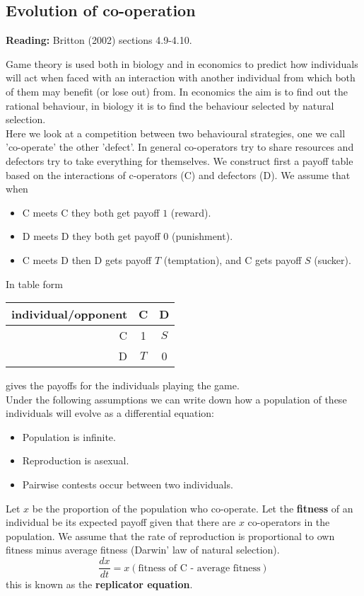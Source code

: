 
\subsection{\Large Evolution of co-operation}

\label{evocoop}

{\bf Reading:} Britton (2002) sections 4.9-4.10.

Game theory is used both in biology and in economics to predict how
individuals will act when faced with an interaction with another
individual from which both of them may benefit (or lose out) from. In
economics the aim is to find out the rational behaviour, in biology it
is to find the behaviour selected by natural selection.\\

Here we look at a competition between two behavioural
strategies, one we call 'co-operate' the other 'defect'. In general
co-operators try to share resources and defectors try to take
everything for themselves. We construct first a payoff table based on
the interactions of c-operators (C) and defectors (D). We assume that
when
\begin{itemize}
\item C meets C they both get payoff $1$ (reward).
\item D meets D they both get payoff $0$ (punishment).
\item C meets D then D gets payoff $T$ (temptation), and C gets payoff
$S$ (sucker).
\end{itemize}
In table form

\begin{tabular}{r|cc}
individual/opponent & C & D \\
\hline
C & 1 & $S$ \\
D & $T$ & 0 
\end{tabular}

gives the payoffs for the individuals playing the game.\\

Under the following assumptions we can write down how a population of
these individuals will evolve as a differential equation:
\begin{itemize}
\item Population is infinite.
\item Reproduction is asexual.
\item Pairwise contests occur between two individuals.
\end{itemize}
Let $x$ be the proportion of the population who co-operate. Let the
{\bf fitness} of an individual be its expected payoff given that there
are $x$ co-operators in the population. We assume that the rate of
reproduction is proportional to own fitness minus average fitness
(Darwin' law of natural selection).
\begin{equation}
\frac{dx}{dt} = x (\mbox{fitness of C - average fitness}) \label{repeq}
\end{equation}
this is known as the {\bf replicator equation}.\\


